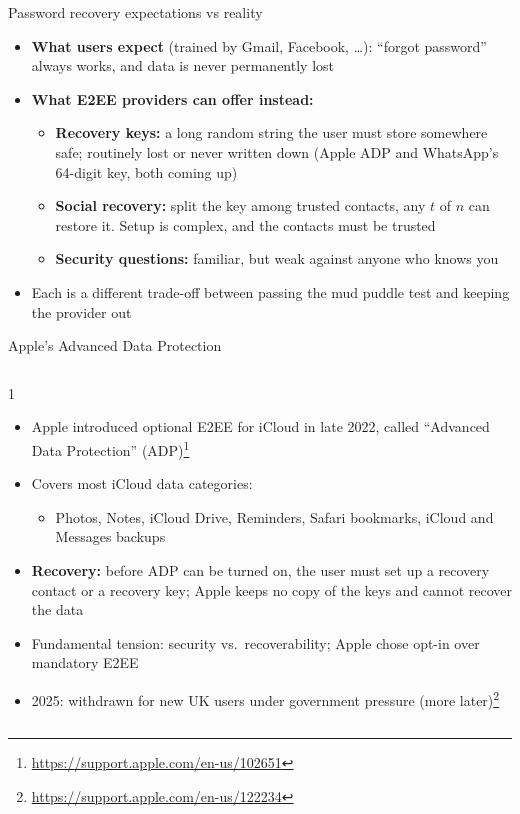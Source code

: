 \ifdefined\PRESENTATION\else\PassOptionsToClass{handout}{beamer}\fi\documentclass[aspectratio=169, lualatex]{beamer}
\begin{document}
\begin{frame}{Password recovery expectations vs reality}
	\begin{itemize}
		\item \textbf{What users expect} (trained by Gmail, Facebook, \ldots): ``forgot password'' always works, and data is never permanently lost
		\item \textbf{What E2EE providers can offer instead:}
		      \begin{itemize}
			      \item \textbf{Recovery keys:} a long random string the user must store somewhere safe; routinely lost or never written down (Apple ADP and WhatsApp's 64-digit key, both coming up)
			      \item \textbf{Social recovery:} split the key among trusted contacts, any $t$ of $n$ can restore it. Setup is complex, and the contacts must be trusted
			      \item \textbf{Security questions:} familiar, but weak against anyone who knows you
		      \end{itemize}
		\item Each is a different trade-off between passing the mud puddle test and keeping the provider out
	\end{itemize}
\end{frame}

\begin{frame}{Apple's Advanced Data Protection}
	\begin{columns}[c]
		\begin{column}{1\textwidth}
			\begin{itemize}
				\item Apple introduced optional E2EE for iCloud in late 2022, called ``Advanced Data Protection'' (ADP)\footnote{\url{https://support.apple.com/en-us/102651}}
				\item Covers most iCloud data categories:
				      \begin{itemize}
					      \item Photos, Notes, iCloud Drive, Reminders, Safari bookmarks, iCloud and Messages backups
				      \end{itemize}
				\item \textbf{Recovery:} before ADP can be turned on, the user must set up a recovery contact or a recovery key; Apple keeps no copy of the keys and cannot recover the data
				\item Fundamental tension: security vs.\ recoverability; Apple chose opt-in over mandatory E2EE
				\item 2025: withdrawn for new UK users under government pressure (more later)\footnote{\url{https://support.apple.com/en-us/122234}}
			\end{itemize}
		\end{column}
	\end{columns}
\end{frame}
\end{document}
